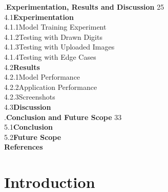 \documentclass[12pt,a4paper]{report}
\begin{document}
.\quad \textbf{Experimentation, Results and Discussion} \hfill 25\\[12pt]
\hspace*{1cm}4.1\quad \textbf{Experimentation} \\[12pt]
\hspace*{2cm}4.1.1\quad Model Training Experiment \\[12pt]
\hspace*{2cm}4.1.2\quad Testing with Drawn Digits \\[12pt]
\hspace*{2cm}4.1.3\quad Testing with Uploaded Images \\[12pt]
\hspace*{2cm}4.1.4\quad Testing with Edge Cases \\[12pt]
\hspace*{1cm}4.2\quad \textbf{Results} \\[12pt]
\hspace*{2cm}4.2.1\quad Model Performance \\[12pt]
\hspace*{2cm}4.2.2\quad Application Performance \\[12pt]
\hspace*{2cm}4.2.3\quad Screenshots \\[12pt]
\hspace*{1cm}4.3\quad \textbf{Discussion} \\[20pt]

.\quad \textbf{Conclusion and Future Scope} \hfill 33\\[12pt]
\hspace*{1cm}5.1\quad \textbf{Conclusion} \\[12pt]
\hspace*{1cm}5.2\quad \textbf{Future Scope} \\[12pt]
\hspace*{1cm}\textbf{References} \\[12pt]

\newpage


\chapter{Introduction}
\end{document}
